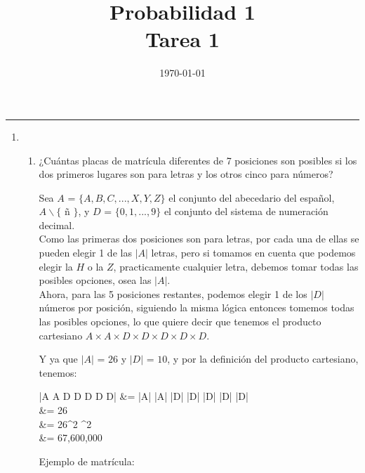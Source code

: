\documentclass{article}
\title{\textsf{Probabilidad 1} \\ \textsf{Tarea 1}}
\author{}
\date{\today}
\begin{document}
\maketitle
\hrule
\par\bigskip


\begin{enumerate}
    \item 
		\begin{enumerate}
			\item ¿Cuántas placas de matrícula diferentes de 7 posiciones son posibles si los dos primeros lugares son para letras y los otros cinco para números? \par
    
				Sea $A$ = $\{ A, B, C, ..., X, Y, Z \}$ el conjunto del abecedario del español, $A \backslash \{$ ñ $\}$, y $D$ = $\{ 0, 1, ... , 9 \}$ el conjunto del sistema de numeraci\'on decimal. \\
				
				Como las primeras dos posiciones son para letras, por cada una de ellas se pueden elegir 1 de las $|A|$ letras, pero si tomamos en cuenta que podemos elegir la $H$ o la $Z$, practicamente cualquier letra,
				debemos tomar todas las posibles opciones, osea las $|A|$. \\
			
				Ahora, para las 5 posiciones restantes, podemos elegir 1 de los $|D|$ n\'umeros por posici\'on, siguiendo la misma l\'ogica entonces tomemos todas las posibles opciones, lo que quiere decir que 
				tenemos el producto cartesiano $A \times A \times D \times D \times D \times D \times D$.
			
				Y ya que $|A|$ = $26$ y $|D|$ = $10$, y por la definici\'on del producto cartesiano, tenemos:

				\begin{flalign*}
					|A \times A \times D \times D \times D \times D \times D| &= |A| \cdot |A| \cdot |D| \cdot |D| \cdot |D| \cdot |D| \cdot |D| \\
					&= 26  \cdot 10 \cdot 10    \\
					&= 26^2 ^2 \\
					&= 67,600,000 
				\end{flalign*}
				
				Ejemplo de matrícula: 
				
				\begin{center}

					     \framebox[0.8cm][c]{2} 


\end{center}
\end{enumerate}
\end{enumerate}
\end{document}
